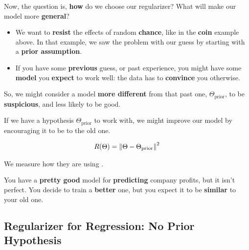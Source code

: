         Now, the question is, \textbf{how} do we choose our regularizer? What will make our model more \textbf{general}?

        \begin{itemize}
            \item We want to \textbf{resist} the effects of random \textbf{chance}, like in the \textbf{coin} example above. In that example, we saw the problem with our guess by starting with a \textbf{prior assumption}.
            
            \item If you have some \textbf{previous} guess, or past experience, you might have some \textbf{model} you \textbf{expect} to work well: the data has to \textbf{convince} you otherwise.
            
        \end{itemize}
        
        
        
        So, we might consider a model \textbf{more different} from that past one, $\Theta_{\text{prior}}$, to be \textbf{suspicious}, and less likely to be good.\\
        
        \begin{concept}
            If we have a  hypothesis $\Theta_{\text{prior}}$ to work with, we might improve our  model by encouraging it to be  to the old one.
            
            \begin{equation*}
                R(\Theta)= \left\lVert \Theta - \Theta_{\text{prior}} \right\rVert^2
            \end{equation*}
            
            We measure how  they are using .
            
        \end{concept}
        
        \miniex You have a \textbf{pretty good} model for \textbf{predicting} company profits, but it isn't perfect. You decide to train a \textbf{better} one, but you expect it to be \textbf{similar} to your old one.
        
        
    \subsection{Regularizer for Regression: No Prior Hypothesis}
    
